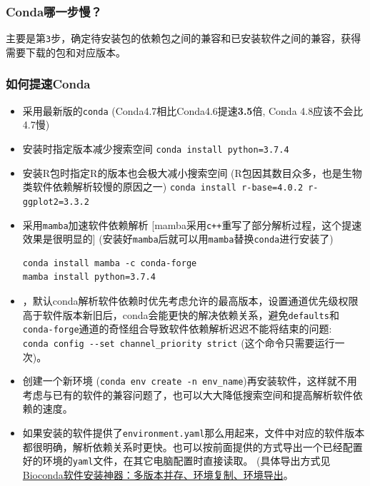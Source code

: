 \documentclass[]{article}
\numberwithin{figure}{section}
\numberwithin{table}{section}
\begin{document}
\hypertarget{cond_which_step_slow}{%
\subsubsection{Conda哪一步慢？}\label{cond_which_step_slow}}

主要是第\texttt{3}步，确定待安装包的依赖包之间的兼容和已安装软件之间的兼容，获得需要下载的包和对应版本。

\hypertarget{cond_accelarate}{%
\subsubsection{如何提速Conda}\label{cond_accelarate}}

\begin{itemize}
\item
  采用最新版的\texttt{conda} (Conda4.7相比Conda4.6提速\textbf{3.5}倍, Conda 4.8应该不会比4.7慢)
\item
  安装时指定版本减少搜索空间 \texttt{conda\ install\ python=3.7.4}
\item
  安装R包时指定R的版本也会极大减小搜索空间 (R包因其数目众多，也是生物类软件依赖解析较慢的原因之一) \texttt{conda\ install\ r-base=4.0.2\ r-ggplot2=3.3.2}
\item
  采用\texttt{mamba}加速软件依赖解析 {[}mamba采用\texttt{c++}重写了部分解析过程，这个提速效果是很明显的{]} (安装好\texttt{mamba}后就可以用\texttt{mamba}替换\texttt{conda}进行安装了)

\begin{verbatim}
conda install mamba -c conda-forge
mamba install python=3.7.4
\end{verbatim}
\item
  ，默认conda解析软件依赖时优先考虑允许的最高版本，设置通道优先级权限高于软件版本新旧后，conda会能更快的解决依赖关系，避免\texttt{defaults}和\texttt{conda-forge}通道的奇怪组合导致软件依赖解析迟迟不能将结束的问题: \texttt{conda\ config\ -\/-set\ channel\_priority\ strict} (这个命令只需要运行一次)。
\item
  创建一个新环境 (\texttt{conda\ env\ create\ -n\ env\_name})再安装软件，这样就不用考虑与已有的软件的兼容问题了，也可以大大降低搜索空间和提高解析软件依赖的速度。
\item
  如果安装的软件提供了\texttt{environment.yaml}那么用起来，文件中对应的软件版本都很明确，解析依赖关系时更快。也可以按前面提供的方式导出一个已经配置好的环境的\texttt{yaml}文件，在其它电脑配置时直接读取。 (具体导出方式见\href{https://mp.weixin.qq.com/s/XZf652njPMg9qUTjcVCMgQ}{Bioconda软件安装神器：多版本并存、环境复制、环境导出}。


\end{itemize}
\end{document}
